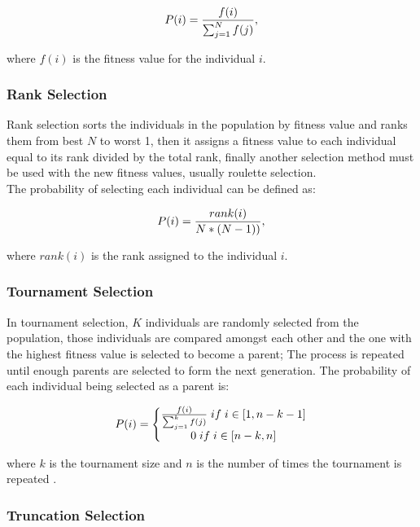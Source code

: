 	\begin{equation*}
	P(i) = {f(i)\over{\sum_{j=1}^{N}f(j)}},
	\end{equation*}

	where $f(i)$ is the fitness value for the individual $i$.

	\subsubsection{Rank Selection}

	Rank selection sorts the individuals in the population by fitness value and ranks them from best $N$ to worst 1, then it assigns a fitness value to each individual equal to its rank divided by the total rank, finally another selection method must be used with the new fitness values, usually roulette selection.
	\\The probability of selecting each individual can be defined as:

	\begin{equation*}
	P(i)={rank(i)\over{N*(N-1))}},
	\end{equation*}

	where $rank(i)$ is the rank assigned to the individual $i$.

	\subsubsection{Tournament Selection}

	In tournament selection, $K$ individuals are randomly selected from the population, those individuals are compared amongst each other and the one with the highest fitness value is selected to become a parent; The process is repeated until enough parents are selected to form the next generation.
	The probability of each individual being selected as a parent is:

	\begin{equation*}
	P(i) = \left\{\begin{matrix}
	{{f(i)}\over{\sum_{j=1}^{k}f(j)}} \; if \; i \in [1,n-k-1] \\
	0 \; if \; i  \in [n-k,n]
	\end{matrix}\right.
	\end{equation*}

	where $k$ is the tournament size and $n$ is the number of times the tournament is repeated \parencite{Jebari2013}.

	\subsubsection{Truncation Selection}

